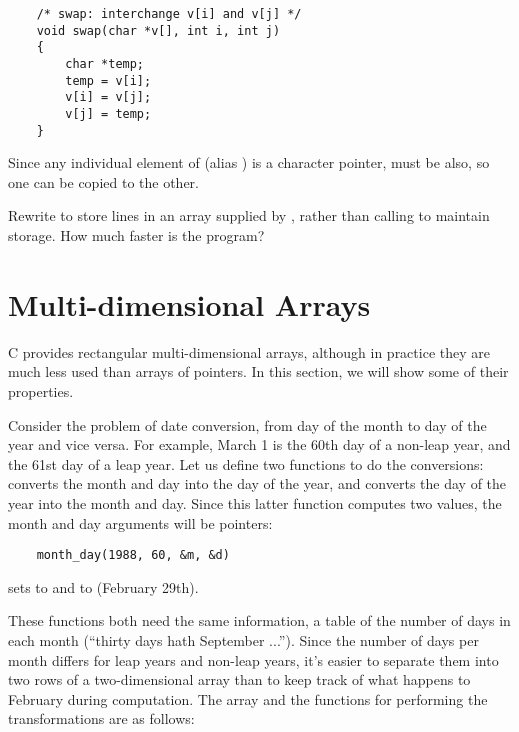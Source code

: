 \begin{lstlisting}
    /* swap: interchange v[i] and v[j] */
    void swap(char *v[], int i, int j)
    {
        char *temp;
        temp = v[i];
        v[i] = v[j];
        v[j] = temp;
    }
\end{lstlisting}

Since any individual element of  (alias ) is a character pointer,  must be also, so one can be copied to the other.
\newline

\begin{ExerciseList}
\Exercise Rewrite  to store lines in an array supplied by , rather than calling  to maintain storage. How much faster is the program?
\end{ExerciseList}



\section{Multi-dimensional Arrays}


C provides rectangular multi-dimensional arrays, although in practice they are much less used than arrays of pointers.
In this section, we will show some of their properties.

Consider the problem of date conversion, from day of the month to day of the year and vice versa.
For example, March 1 is the 60th day of a non-leap year, and the 61st day of a leap year.
Let us define two functions to do the conversions:  converts the month and day into the day of the year, and  converts the day of the year into the month and day.
Since this latter function computes two values, the month and day arguments will be pointers:
\begin{lstlisting}
    month_day(1988, 60, &m, &d)
\end{lstlisting}
sets  to  and  to  (February 29th).

These functions both need the same information, a table of the number of days in each month (``thirty days hath September ...'').
Since the number of days per month differs for leap years and non-leap years, it's easier to separate them into two rows of a two-dimensional array than to keep track of what happens to February during computation.
The array and the functions for performing the transformations are as follows:

